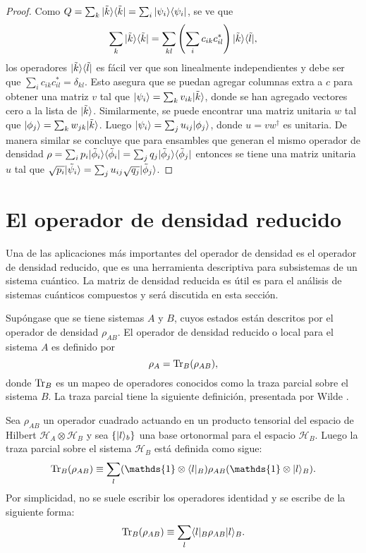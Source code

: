 \begin{proof}
Como  $Q=\sum_k  |\tilde{k}\rangle \langle \tilde{k}|=\sum_{i}|\psi_i\rangle \langle\psi_i|$, se ve
que \[\sum_k |\tilde{k}\rangle \langle \tilde{k}|=\sum_{kl} \left(\sum_i
c_{ik}c_{il}^{*}\right)|\tilde{k}\rangle \langle \tilde{l}|,\] los operadores $|\tilde{k}
\rangle \langle \tilde{l}|$ es fácil ver  que son linealmente independientes y debe ser
que $\sum_i c_{ik}c_{il}^{*}=\delta_{kl}$. Esto asegura que se puedan agregar
columnas extra a $c$ para obtener una matriz $v$ tal que
$|\psi_i\rangle=\sum_{k}v_{ik}|\tilde{k}\rangle  $, donde se han agregado  vectores cero a la
lista de $|\tilde{k}\rangle$. Similarmente, se puede encontrar una matriz unitaria
$w$ tal que $|\phi_j\rangle=\sum_{k}w_{jk}|\tilde{k}\rangle$. Luego $|\psi_i\rangle=\sum_j
u_{ij}|\phi_j\rangle$, donde  $u=vw^\dagger$ es unitaria. De manera similar se concluye que para ensambles que generan el mismo operador de densidad $\rho=\sum_i p_i |\tilde{\phi}_i\rangle \langle\tilde{\phi}_i|= \sum_j q_j|\tilde{\phi}_j \rangle \langle\tilde{\phi}_j| $ entonces se tiene una matriz unitaria $u$ tal que  $\sqrt{p_i}|\tilde{\psi}_i\rangle=\sum_{j} u_{ij} \sqrt{q_j}|\tilde{\phi}_j\rangle$.
\end{proof}

\section{El operador de densidad reducido} %

Una de las aplicaciones más importantes del operador de densidad es el operador
de densidad reducido, que es una herramienta descriptiva para subsistemas de un
sistema cuántico. La matriz de densidad reducida es útil es
para el análisis de sistemas cuánticos compuestos y será discutida
en esta sección.


Supóngase que se tiene sistemas $A$ y $B$, cuyos estados están descritos por el
operador de densidad $\rho_{AB}$. El operador de densidad reducido o local para
el sistema $A$ es definido por  
\begin{equation}
	\rho_A={\rm Tr}_B(\rho_{AB}),
\end{equation} 
donde ${\rm Tr}_B$ es un mapeo de operadores conocidos como la traza parcial sobre
el sistema $B$. La traza parcial tiene la siguiente definición, presentada
por Wilde {\cite{wilde2011classical}}.

\begin{definition}
Sea  $ \rho_{AB}$ un operador cuadrado actuando en un producto tensorial del
espacio de Hilbert $\mathcal{H}_A \otimes \mathcal{ H}_B$ y sea $\{|l\rangle_b\}$
una base ortonormal para el espacio $\mathcal{H}_B$. Luego la traza parcial
sobre el sistema $\mathcal{H}_B$ está definida como sigue: 
\begin{equation}
		\tr_B(\rho_{AB})\equiv\sum_{l} (\mathds{1}\otimes\la l|_B)\rho_{AB}(\mathds{1}\otimes|l\ra_B).	
\end{equation} 
Por simplicidad, no se suele escribir los operadores identidad y se escribe de la siguiente forma:
\begin{equation}
	{\rm Tr}_B(\rho_{AB})\equiv\sum_{l} \langle l|_B\rho_{AB}|l\rangle_B.
\end{equation}
\end{definition}

